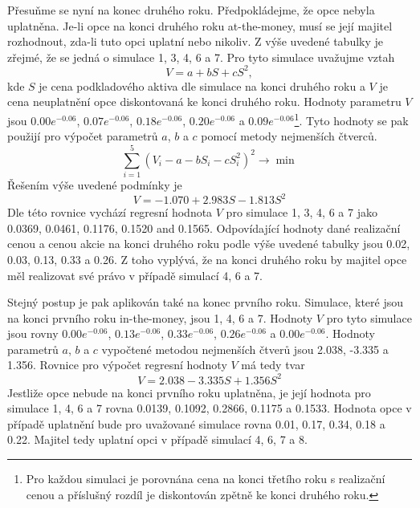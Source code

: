 \documentclass[a4paper]{book}
\begin{document}
Přesuňme se nyní na konec druhého roku. Předpokládejme, že opce nebyla uplatněna. Je-li opce na konci druhého roku at-the-money, musí se její majitel rozhodnout, zda-li tuto opci uplatní nebo nikoliv. Z výše uvedené tabulky je zřejmé, že se jedná o simulace 1, 3, 4, 6 a 7. Pro tyto simulace uvažujme vztah
\begin{equation*}
V = a + bS + cS^2,
\end{equation*}
kde $S$ je cena podkladového aktiva dle simulace na konci druhého roku a $V$ je cena neuplatnění opce diskontovaná ke konci druhého roku. Hodnoty parametru $V$ jsou $0.00e^{-0.06}$, $0.07e^{-0.06}$, $0.18e^{-0.06}$, $0.20e^{-0.06}$ a $0.09e^{-0.06}$\footnote{Pro každou simulaci je porovnána cena na konci třetího roku s realizační cenou a příslušný rozdíl je diskontován zpětně ke konci druhého roku.}. Tyto hodnoty se pak použijí pro výpočet parametrů $a$, $b$ a $c$ pomocí metody nejmenších čtverců.
\begin{equation*}
\sum^5_{i=1}(V_i - a -bS_i-cS^2_i)^2 \xrightarrow{} \min
\end{equation*}
Řešením výše uvedené podmínky je
\begin{equation*}
V = -1.070 + 2.983S - 1.813S^2
\end{equation*}
Dle této rovnice vychází regresní hodnota $V$ pro simulace 1, 3, 4, 6 a 7 jako 0.0369, 0.0461, 0.1176, 0.1520 and 0.1565. Odpovídající hodnoty dané realizační cenou a cenou akcie na konci druhého roku podle výše uvedené tabulky jsou 0.02, 0.03, 0.13, 0.33 a 0.26. Z toho vyplývá, že na konci druhého roku by majitel opce měl realizovat své právo v případě simulací 4, 6 a 7.

Stejný postup je pak aplikován také na konec prvního roku. Simulace, které jsou na konci prvního roku in-the-money, jsou 1, 4, 6 a 7. Hodnoty $V$ pro tyto simulace jsou rovny $0.00e^{-0.06}$, $0.13e^{-0.06}$, $0.33e^{-0.06}$, $0.26e^{-0.06}$ a $0.00e^{-0.06}$. Hodnoty parametrů $a$, $b$ a $c$ vypočtené metodou nejmenších čtverů jsou 2.038, -3.335 a 1.356. Rovnice pro výpočet regresní hodnoty $V$ má tedy tvar
\begin{equation*}
V = 2.038 - 3.335S + 1.356S^2
\end{equation*}
Jestliže opce nebude na konci prvního roku uplatněna, je její hodnota pro simulace 1, 4, 6 a 7 rovna 0.0139, 0.1092, 0.2866, 0.1175 a 0.1533. Hodnota opce v případě uplatnění bude pro uvažované simulace rovna 0.01, 0.17, 0.34, 0.18 a 0.22. Majitel tedy uplatní opci v případě simulací 4, 6, 7 a 8.
\end{document}
